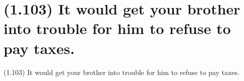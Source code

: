 \documentclass{article}
\begin{document}
\clearpage

%
%

\section*{(1.103) It would get your brother into trouble for him to refuse to pay taxes.}

\bigbreak
\begin{enumerate*}
\item[(1.103)] It would get your brother into trouble for him to refuse to pay taxes.
\end{enumerate*}
\bigbreak
\end{document}
